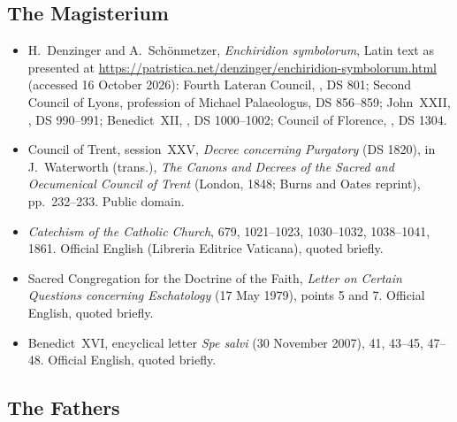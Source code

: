 \subsection*{The Magisterium}

{\fontsize{8.6}{9.6}\selectfont
\begin{itemize}[itemsep=0pt,parsep=0pt,topsep=0.05em]
\item H.~Denzinger and A.~Sch\"onmetzer, \emph{Enchiridion symbolorum}, Latin text as presented at \url{https://patristica.net/denzinger/enchiridion-symbolorum.html} (accessed 16 October 2026): Fourth Lateran Council, , DS 801; Second Council of Lyons, profession of Michael Palaeologus, DS 856--859; John~XXII, , DS 990--991; Benedict~XII, , DS 1000--1002; Council of Florence, , DS 1304.
\item Council of Trent, session~XXV, \emph{Decree concerning Purgatory} (DS 1820), in J.~Waterworth (trans.), \emph{The Canons and Decrees of the Sacred and Oecumenical Council of Trent} (London, 1848; Burns and Oates reprint), pp.~232--233. Public domain.
\item \emph{Catechism of the Catholic Church}, 679, 1021--1023, 1030--1032, 1038--1041, 1861. Official English (Libreria Editrice Vaticana), quoted briefly.
\item Sacred Congregation for the Doctrine of the Faith, \emph{Letter on Certain Questions concerning Eschatology} (17 May 1979), points 5 and 7. Official English, quoted briefly.
\item Benedict~XVI, encyclical letter \emph{Spe salvi} (30 November 2007), 41, 43--45, 47--48. Official English, quoted briefly.
\end{itemize}}

\subsection*{The Fathers}

